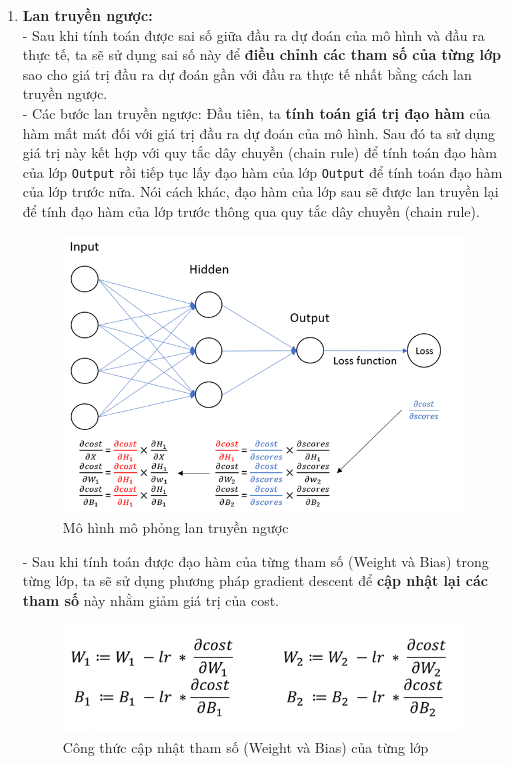 \begin{enumerate}
\begin{figure}[H]
    \end{figure}
    \item \textbf{Lan truyền ngược:}
    \\- Sau khi tính toán được sai số giữa đầu ra dự đoán của mô hình và đầu ra thực tế, ta sẽ sử dụng sai số này để \textbf{điều chỉnh các tham số của từng lớp} sao cho giá trị đầu ra dự đoán gần với đầu ra thực tế nhất bằng cách lan truyền ngược. 
    \\- Các bước lan truyền ngược: Đầu tiên, ta \textbf{tính toán giá trị đạo hàm} của hàm mất mát đối với giá trị đầu ra dự đoán của mô hình. Sau đó ta sử dụng giá trị này kết hợp với quy tắc dây chuyền (chain rule) để tính toán đạo hàm của lớp \texttt{Output} rồi tiếp tục lấy đạo hàm của lớp \texttt{Output} để tính toán đạo hàm của lớp trước nữa. Nói cách khác, đạo hàm của lớp sau sẽ được lan truyền lại để tính đạo hàm của lớp trước thông qua quy tắc dây chuyền (chain rule).
    \begin{figure}[H]
        \centering
        \includegraphics[width=0.7\linewidth]{img/backpropagation.png}
        \caption{Mô hình mô phỏng lan truyền ngược}
    \end{figure}
    - Sau khi tính toán được đạo hàm của từng tham số (Weight và Bias) trong từng lớp, ta sẽ sử dụng phương pháp gradient descent để \textbf{cập nhật lại các tham số} này nhằm giảm giá trị của cost.
    \begin{figure}[H]
        \centering
        \includegraphics[width=0.75\linewidth]{gd_bias_weight.png}
        \caption{Công thức cập nhật tham số (Weight và Bias) của từng lớp}
        
    \end{figure}
\end{enumerate}


